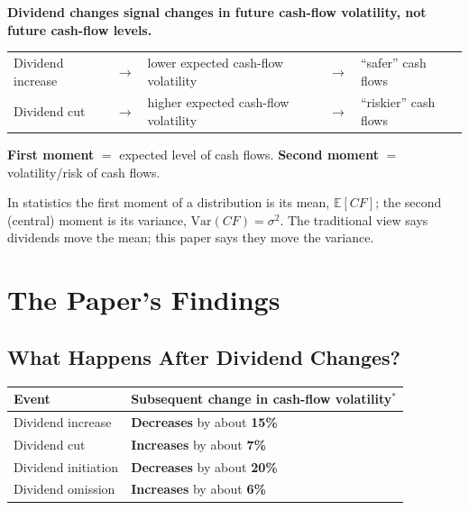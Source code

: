 \begin{keybox}
\textbf{Dividend changes signal changes in future cash-flow volatility, not future cash-flow levels.}
\begin{center}
\begin{tabular}{@{}lclcl@{}}
Dividend increase & $\longrightarrow$ & lower expected cash-flow volatility & $\longrightarrow$ & ``safer'' cash flows\\
Dividend cut & $\longrightarrow$ & higher expected cash-flow volatility & $\longrightarrow$ & ``riskier'' cash flows\\
\end{tabular}
\end{center}
\textbf{First moment} $=$ expected level of cash flows. \textbf{Second moment} $=$ volatility/risk of cash flows.
\end{keybox}
\begin{addbox}
In statistics the first moment of a distribution is its mean, $\mathbb{E}[CF]$; the second (central) moment is its variance, $\text{Var}(CF)=\sigma^2$. The traditional view says dividends move the mean; this paper says they move the variance.
\end{addbox}

\section{The Paper's Findings}

\subsection{What Happens After Dividend Changes?}

\begin{center}
\begin{tabular}{@{}ll@{}}
\toprule
\textbf{Event} & \textbf{Subsequent change in cash-flow volatility$^*$}\\
\midrule
Dividend increase & \textbf{Decreases} by about \textbf{15\%}\\
Dividend cut & \textbf{Increases} by about \textbf{7\%}\\
Dividend initiation & \textbf{Decreases} by about \textbf{20\%}\\
Dividend omission & \textbf{Increases} by about \textbf{6\%}\\
\bottomrule
\end{tabular}

\end{center}

